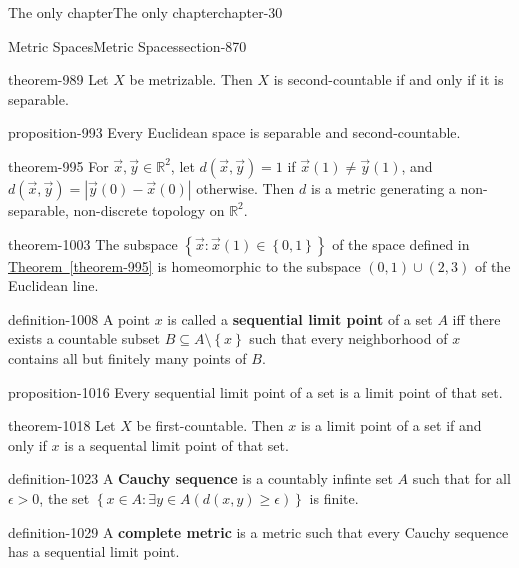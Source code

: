\documentclass[oneside,10pt,]{book}
\newcommand{\terminology}[1]{\textbf{#1}}
\newcommand{\mb}{\mathbb}
\newcommand{\setBuilder}[2]{\left\{#1:#2\right\}}
\newcommand{\setList}[1]{\left\{#1\right\}}
\newcommand{\gt}{>}
\begin{document}
\begin{chapterptx}{The only chapter}{}{The only chapter}{}{}{chapter-30}
\begin{sectionptx}{Metric Spaces}{}{Metric Spaces}{}{}{section-870}
\begin{theorem}{}{}{theorem-989}
\hypertarget{p-990}{}%
Let \(X\) be metrizable. Then \(X\) is second-countable if and only if it is separable.%
\end{theorem}
\begin{proposition}{}{}{proposition-993}%
\hypertarget{p-994}{}%
Every Euclidean space is separable and second-countable.%
\end{proposition}
\begin{theorem}{}{}{theorem-995}%
\hypertarget{p-996}{}%
For \(\vec x,\vec y\in\mb R^2\), let \(d(\vec x,\vec y)=1\) if \(\vec x(1)\not=\vec y(1)\), and \(d(\vec x,\vec y)=|\vec y(0)-\vec x(0)|\) otherwise. Then \(d\) is a metric generating a non-separable, non-discrete topology on \(\mb R^2\).%
\end{theorem}
\begin{theorem}{}{}{theorem-1003}%
\hypertarget{p-1004}{}%
The subspace \(\setBuilder{\vec x}{\vec{x}(1)\in\setList{0,1}}\) of the space defined in \hyperref[theorem-995]{Theorem~\ref{theorem-995}} is homeomorphic to the subspace \((0,1)\cup(2,3)\) of the Euclidean line.%
\end{theorem}
\begin{definition}{}{definition-1008}%
\hypertarget{p-1009}{}%
A point \(x\) is called a \terminology{sequential limit point} of a set \(A\) iff there exists a countable subset \(B\subseteq A\setminus\setList{x}\) such that every neighborhood of \(x\) contains all but finitely many points of \(B\).%
\end{definition}
\begin{proposition}{}{}{proposition-1016}%
\hypertarget{p-1017}{}%
Every sequential limit point of a set is a limit point of that set.%
\end{proposition}
\begin{theorem}{}{}{theorem-1018}%
\hypertarget{p-1019}{}%
Let \(X\) be first-countable. Then \(x\) is a limit point of a set if and only if \(x\) is a sequental limit point of that set.%
\end{theorem}
\begin{definition}{}{definition-1023}%
\hypertarget{p-1024}{}%
A \terminology{Cauchy sequence} is a countably infinte set \(A\) such that for all \(\epsilon\gt0\), the set \(\setBuilder{x\in A}{\exists y\in A(d(x,y)\geq\epsilon)}\) is finite.%
\end{definition}
\begin{definition}{}{definition-1029}%
\hypertarget{p-1030}{}%
A \terminology{complete metric} is a metric such that every Cauchy sequence has a sequential limit point.%

\end{definition}
\end{sectionptx}
\end{chapterptx}
\end{document}
